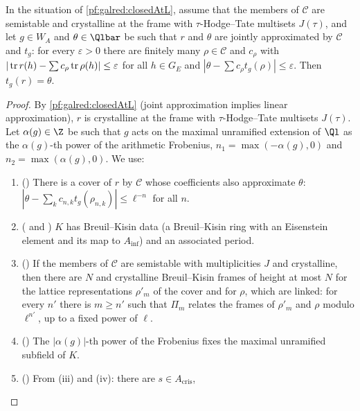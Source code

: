 \begin{theorem}\label{pf:galred:closedtr}
In the situation of \cref{pf:galred:closedAtL}, assume that the members of $\mathcal C$ are semistable and crystalline at
the frame with $\tau$-Hodge--Tate multisets $J(\tau)$, and let $g\in W_A$ and $\theta\in\Qlbar$ be such that $r$ and
$\theta$ are jointly approximated by $\mathcal C$ and $t_g$: for every $\varepsilon>0$ there are finitely many
$\rho\in\mathcal C$ and $c_\rho$ with $|\operatorname{tr} r(h)-\sum c_\rho\operatorname{tr}\rho(h)|\le\varepsilon$ for all $h\in G_E$ and
$|\theta-\sum c_\rho t_g(\rho)|\le\varepsilon$. Then $t_g(r)=\theta$.
\end{theorem}

\begin{proof}
By \cref{pf:galred:closedAtL} (joint approximation implies linear approximation), $r$ is crystalline at the frame with
$\tau$-Hodge--Tate multisets $J(\tau)$. Let $\alpha(g)\in\Z$ be such that $g$ acts on the maximal unramified extension of
$\Ql$ as the $\alpha(g)$-th power of the arithmetic Frobenius, $n_1=\max(-\alpha(g),0)$ and $n_2=\max(\alpha(g),0)$. We use:
\begin{enumerate}[label=(\roman*),nosep]
\item () There is a cover of $r$ by $\mathcal C$ whose
  coefficients also approximate $\theta$: $|\theta-\sum_kc_{n,k}t_g(\rho_{n,k})|\le\ell^{-n}$ for all $n$.
\item ( and ) $K$ has Breuil--Kisin data (a
  Breuil--Kisin ring with an Eisenstein element and its map to $A_{\inf}$) and an associated period.
\item () If the members of $\mathcal C$ are semistable with
  multiplicities $J$ and crystalline, then there are $N$ and crystalline Breuil--Kisin frames of height at most $N$ for the
  lattice representations $\rho'_m$ of the cover and for $\rho$, which are linked: for every $n'$ there is $m\ge n'$ such that
  $\Pi_m$ relates the frames of $\rho'_m$ and $\rho$ modulo $\ell^{n'}$, up to a fixed power of $\ell$.
\item () The $|\alpha(g)|$-th power of the Frobenius fixes the
  maximal unramified subfield of $K$.
\item () From (iii) and (iv): there are $s\in A_{\mathrm{cris}}$,

\end{enumerate}
\end{proof}
